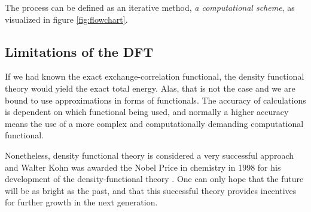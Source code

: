 The process can be defined as an iterative method, \textit{a computational scheme}, as visualized in figure \ref{fig:flowchart}.



\clearpage
\subsection{Limitations of the DFT}

If we had known the exact exchange-correlation functional, the density functional theory would yield the exact total energy. Alas, that is not the case and we are bound to use approximations in forms of functionals. The accuracy of calculations is dependent on which functional being used, and normally a higher accuracy means the use of a more complex and computationally demanding computational functional.

Nonetheless, density functional theory is considered a very successful approach and Walter Kohn was awarded the Nobel Price in chemistry in 1998 for his development of the density-functional theory \cite{Freitas1999}. One can only hope that the future will be as bright as the past, and that this successful theory provides incentives for further growth in the next generation.
\clearpage
